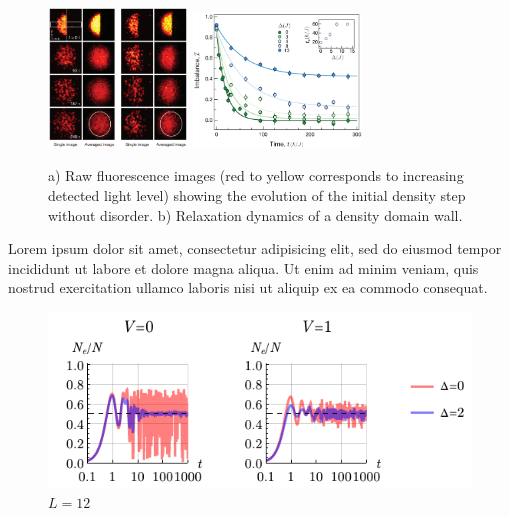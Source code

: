 \begin{figure}[h]
    \centering
    \includegraphics[align=c, width=0.33\textwidth]{imgs/MBL_2D_exp_1.png}
    \hspace{10 mm} 
    \includegraphics[align=c, width=0.4\textwidth]{imgs/MBL_2D_exp_2.png}
    \caption{
	    a) Raw fluorescence images (red to yellow corresponds to increasing detected light level) showing the evolution of the initial density step without disorder. 
	    b) Relaxation dynamics of a density domain wall.
    }
\end{figure}


Lorem ipsum dolor sit amet, consectetur adipisicing elit, sed do eiusmod
tempor incididunt ut labore et dolore magna aliqua. Ut enim ad minim veniam,
quis nostrud exercitation ullamco laboris nisi ut aliquip ex ea commodo
consequat. 

\begin{figure}[h]
    \centering
    \includegraphics{imgs/loVD.pdf}
    \caption{$L=12$}
\end{figure}



